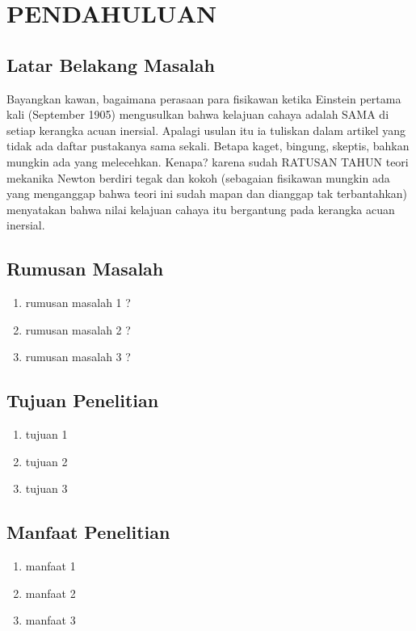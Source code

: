 \chapter{PENDAHULUAN}
\section{Latar Belakang Masalah}
Bayangkan kawan, bagaimana perasaan para fisikawan ketika Einstein pertama kali (September 1905) mengusulkan bahwa kelajuan  cahaya adalah SAMA di setiap kerangka acuan inersial. Apalagi usulan itu ia tuliskan dalam artikel yang tidak ada daftar pustakanya sama sekali. Betapa kaget, bingung, skeptis, bahkan mungkin ada yang melecehkan. Kenapa? karena sudah RATUSAN TAHUN teori mekanika Newton berdiri tegak dan kokoh (sebagaian fisikawan mungkin ada yang menganggap bahwa teori ini sudah mapan dan dianggap tak terbantahkan) menyatakan bahwa nilai kelajuan cahaya itu bergantung pada kerangka acuan inersial. 

\section{Rumusan Masalah}
\begin{enumerate}
	\item rumusan masalah 1 ?
	\item rumusan masalah 2 ?
	\item rumusan masalah 3 ?
\end{enumerate}

\section{Tujuan Penelitian}
\begin{enumerate}
\item tujuan 1
\item tujuan 2
\item tujuan 3
\end{enumerate}

\section{Manfaat Penelitian}
\begin{enumerate}
\item manfaat 1
\item manfaat 2
\item manfaat 3
\end{enumerate}




